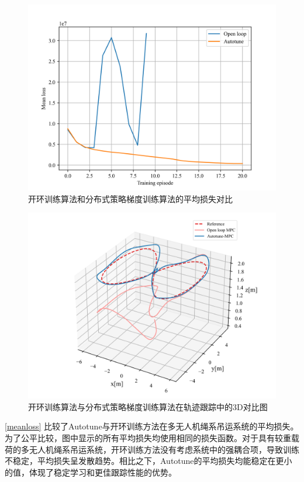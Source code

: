 \documentclass[lang=chs, degree=master, blindreview=true, winfonts=true]{yanputhesis}
\begin{document}
\begin{figure}[hbt!]
	\centering
	\includegraphics[width=30pc]{picture/kk/Mean_loss_cln.png} 
	\caption{开环训练算法和分布式策略梯度训练算法的平均损失对比} 
	\label{meanloss}
\end{figure}

\begin{figure}[hbt!]
	\centering
	\includegraphics[width=36pc]{picture/kk/plot3D.png} 
	\caption{开环训练算法与分布式策略梯度训练算法在轨迹跟踪中的3D对比图} 
	\label{cjb}
\end{figure}

\autoref{meanloss} 比较了Autotune与开环训练方法在多无人机绳系吊运系统的平均损失。为了公平比较，图中显示的所有平均损失均使用相同的损失函数。对于具有较重载荷的多无人机绳系吊运系统，开环训练方法没有考虑系统中的强耦合项，导致训练不稳定，平均损失呈发散趋势。相比之下，Autotune的平均损失均能稳定在更小的值，体现了稳定学习和更佳跟踪性能的优势。
\end{document}

